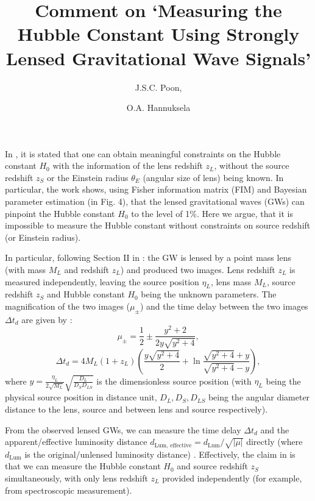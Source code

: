 \documentclass[a4paper,11pt]{article}
\title{Comment on `Measuring the Hubble Constant Using Strongly Lensed Gravitational Wave Signals'}
\author[a]{J.S.C. Poon,}
\author[a]{O.A. Hannuksela}
\affiliation[a]{Department of Physics, The Chinese University of Hong Kong (CUHK),\\Shatin, New Territories, Hong Kong}
\begin{document}
\maketitle

In \cite{Huang_2023}, it is stated that one can obtain meaningful constraints on the Hubble constant $H_0$ with the information of the lens redshift $z_L$, without the source redshift $z_S$ or the Einstein radius $\theta_E$ (angular size of lens) being known. 
In particular, the work shows, using Fisher information matrix (FIM) and Bayesian parameter estimation (in Fig. 4), that the lensed gravitational waves (GWs) can pinpoint the Hubble constant $H_0$ to the level of 1$\%$.
Here we argue, that it is impossible to measure the Hubble constant without constraints on source redshift (or Einstein radius). 

In particular, following Section II in \cite{Huang_2023}: the GW is lensed by a point mass lens (with mass $M_L$ and redshift $z_L$) and produced two images. 
Lens redshift $z_L$ is measured independently, leaving the source position $\eta_L$, lens mass $M_L$, source redshift $z_S$ and Hubble constant $H_0$ being the unknown parameters.
The magnification of the two images ($\mu_\pm$) and the time delay between the two images $\Delta t_d$ are given by \cite{Huang_2023}:
\begin{equation}
    \mu_{\pm}=\frac{1}{2}\pm\frac{y^2+2}{2y\sqrt{y^2+4}},
    \label{mu point mass}
\end{equation}
\begin{equation}
    \Delta t_d = 4M_L(1+z_L)\left(\frac{y\sqrt{y^2+4}}{2}+\ln{\frac{\sqrt{y^2+4}+y}{\sqrt{y^2+4}-y}}\right),
    \label{td point mass}
\end{equation}
where $y=\frac{\eta_L}{2\sqrt{M_L}}\sqrt{\frac{D_L}{D_S D_{LS}}}$ is the dimensionless source position (with $\eta_L$ being the physical source position in distance unit, $D_L, D_S, D_{LS}$ being the angular diameter distance to the lens, source and between lens and source respectively).

From the observed lensed GWs, we can measure the time delay $\Delta t_d$ and the apparent/effective luminosity distance $d_{\text{Lum, effective}}={d_\text{Lum}}/{\sqrt{|\mu |}}$ directly (where $d_\text{Lum}$ is the original/unlensed luminosity distance) \cite{poon2024galaxylensreconstructionbased}. 
Effectively, the claim in \cite{Huang_2023} is that we can measure the Hubble constant $H_0$ and source redshift $z_S$ simultaneously, with only lens redshift $z_L$ provided independently (for example, from spectroscopic measurement).
\end{document}
